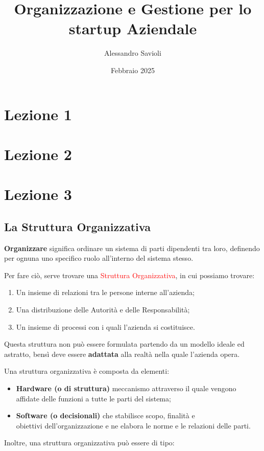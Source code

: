 \documentclass[14pt]{extarticle}
\begin{document}
\title{Organizzazione e Gestione per lo startup Aziendale}
\author{Alessandro Savioli}
\date{Febbraio 2025}

\maketitle

\tableofcontents

\newpage

\section{Lezione 1}

\section{Lezione 2}

\section{Lezione 3}
\subsection{La Struttura Organizzativa}

\textbf{Organizzare} significa ordinare un sistema di parti dipendenti tra loro,
definendo per ognuna uno specifico ruolo all'interno del sistema stesso.

Per fare ciò, serve trovare una \textcolor{red}{Struttura Organizzativa}, in cui
possiamo trovare:
\begin{enumerate}
    \item Un insieme di relazioni tra le persone interne all'azienda;
    \item Una distribuzione delle Autorità e delle Responsabilità;
    \item Un insieme di processi con i quali l'azienda si costituisce.
\end{enumerate}
Questa struttura non può essere formulata partendo da un modello ideale ed
astratto, bensì deve essere \textbf{adattata} alla realtà nella quale l'azienda
opera.

Una struttura organizzativa è composta da elementi:
\begin{itemize}
    \item \textbf{Hardware (o di struttura)} meccanismo attraverso il quale
    vengono affidate delle funzioni a tutte le parti del sistema;
    \item \textbf{Software (o decisionali)} che stabilisce scopo, finalità e \\
    obiettivi dell'organizzazione e ne elabora le norme e le relazioni delle
    parti.  
\end{itemize}
Inoltre, una struttura organizzativa può essere di tipo:
\end{document}
